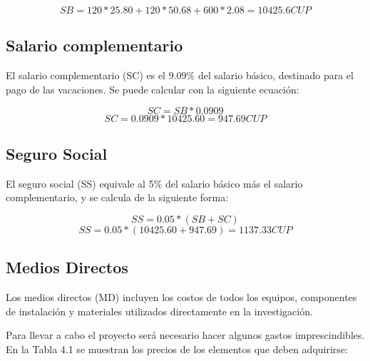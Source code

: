 \begin{equation}
    \label{eq:salary_basico_total}
    SB = 120 * 25.80 + 120 * 50.68 + 600 * 2.08 = 10425.6 CUP
\end{equation}


\subsection{Salario complementario}

El salario complementario (SC) es el 9.09\% del salario básico, destinado para el pago de las
vacaciones. Se puede calcular con la siguiente ecuación:

\begin{equation}
    \label{eq:salary_complementary}
    SC = SB * 0.0909
\end{equation}
\begin{equation}
    \label{eq:salary_complementary_total}
    SC=0.0909*10425.60=947.69 CUP
\end{equation}

\subsection{Seguro Social}

El seguro social (SS) equivale al 5\% del salario básico más el salario complementario, y se
calcula de la siguiente forma:

\begin{equation}
    \label{eq:social_security}
    SS = 0.05 * (SB + SC)
\end{equation}
\begin{equation}
    \label{eq:social_security_total}
    SS=0.05*(10425.60+947.69)=1137.33 CUP
\end{equation}

\subsection{Medios Directos}

Los medios directos (MD) incluyen los costos de todos los equipos, componentes de instalación y
materiales utilizados directamente en la investigación.


Para llevar a cabo el proyecto será necesario hacer algunos gastos imprescindibles. En la Tabla 4.1
se muestran los precios de los elementos que deben adquirirse:

